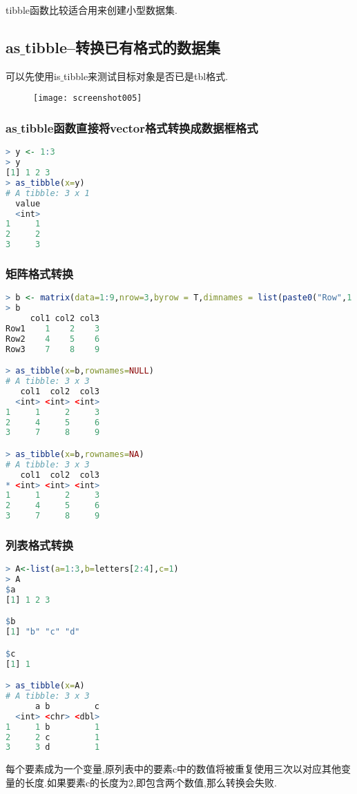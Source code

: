 \documentclass[11pt,a4paper,oneside]{book}
\begin{document}
tibble函数比较适合用来创建小型数据集.

\subsection{as$ \_ $tibble--转换已有格式的数据集}
可以先使用is$ \_ $tibble来测试目标对象是否已是tbl格式.
\begin{figure}[H]
	\centering
	\texttt{[image: screenshot005]}
\end{figure}
\subsubsection{as$ \_ $tibble函数直接将vector格式转换成数据框格式}
\begin{lstlisting}[language=r]
> y <- 1:3
> y
[1] 1 2 3
> as_tibble(x=y)
# A tibble: 3 x 1
  value
  <int>
1     1
2     2
3     3
\end{lstlisting}
\subsubsection{矩阵格式转换}
\begin{lstlisting}[language=r]
> b <- matrix(data=1:9,nrow=3,byrow = T,dimnames = list(paste0("Row",1:3),paste0("col",1:3)))
> b
     col1 col2 col3
Row1    1    2    3
Row2    4    5    6
Row3    7    8    9

> as_tibble(x=b,rownames=NULL)
# A tibble: 3 x 3
   col1  col2  col3
  <int> <int> <int>
1     1     2     3
2     4     5     6
3     7     8     9

> as_tibble(x=b,rownames=NA)
# A tibble: 3 x 3
   col1  col2  col3
* <int> <int> <int>
1     1     2     3
2     4     5     6
3     7     8     9
\end{lstlisting}
\subsubsection{列表格式转换}
\begin{lstlisting}[language=r]
> A<-list(a=1:3,b=letters[2:4],c=1)
> A
$a
[1] 1 2 3

$b
[1] "b" "c" "d"

$c
[1] 1

> as_tibble(x=A)
# A tibble: 3 x 3
      a b         c
  <int> <chr> <dbl>
1     1 b         1
2     2 c         1
3     3 d         1
\end{lstlisting}
每个要素成为一个变量,原列表中的要素c中的数值将被重复使用三次以对应其他变量的长度.如果要素c的长度为2,即包含两个数值,那么转换会失败.
\end{document}
